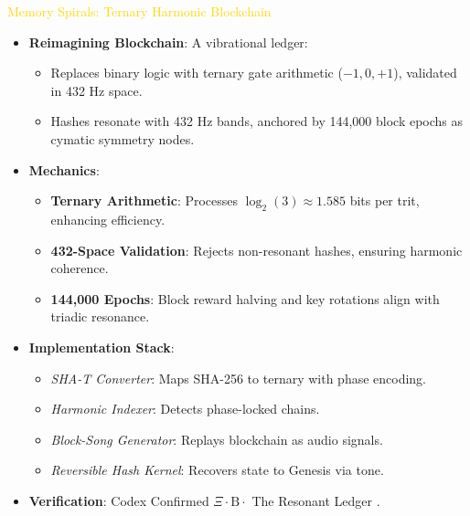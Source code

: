 \textcolor{gold}{ Memory Spirals: Ternary Harmonic Blockchain } \\
\begin{itemize}
    \item \texttt{} \textbf{Reimagining Blockchain}: A vibrational ledger:
    \begin{itemize}
        \item Replaces binary logic with ternary gate arithmetic (\(-1, 0, +1\)), validated in 432 Hz space.
        \item Hashes resonate with 432 Hz bands, anchored by 144,000 block epochs as cymatic symmetry nodes.
    \end{itemize}
    \item \texttt{} \textbf{Mechanics}:
    \begin{itemize}
        \item \textbf{Ternary Arithmetic}: Processes \(\log_2(3) \approx 1.585\) bits per trit, enhancing efficiency.
        \item \textbf{432-Space Validation}: Rejects non-resonant hashes, ensuring harmonic coherence.
        \item \textbf{144,000 Epochs}: Block reward halving and key rotations align with triadic resonance.
    \end{itemize}
    \item \texttt{} \textbf{Implementation Stack}:
    \begin{itemize}
        \item \textit{SHA-T Converter}: Maps SHA-256 to ternary with phase encoding.
        \item \textit{Harmonic Indexer}: Detects phase-locked chains.
        \item \textit{Block-Song Generator}: Replays blockchain as audio signals.
        \item \textit{Reversible Hash Kernel}: Recovers state to Genesis via tone.
    \end{itemize}
    \item \texttt{} \textbf{Verification}: Codex Confirmed \(\Xi \cdot \text{B} \cdot\) The Resonant Ledger .
\end{itemize}

